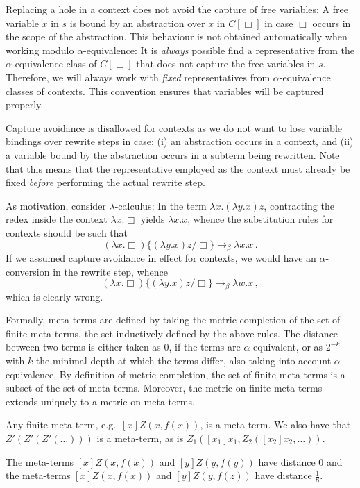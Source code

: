 \documentclass{LMCS}
\theoremstyle{plain}
\theoremstyle{definition}
\newcommand{\rew}{\rightarrow}
\begin{document}
Replacing a hole in a context does not avoid the capture of free variables: A free variable $x$ in $s$ is bound by an abstraction over $x$ in $C[\Box]$ in case $\Box$ occurs in the scope of the abstraction. This behaviour is not obtained automatically when working modulo $\alpha$-equivalence: It is \emph{always} possible find a representative from the $\alpha$-equivalence class of $C[\Box]$ that does not capture the free variables in $s$. Therefore, we will always work with \emph{fixed} representatives from $\alpha$-equivalence classes of contexts. This convention ensures that variables will be captured properly.

\begin{rem}
Capture avoidance is disallowed for contexts as we do not want to lose variable bindings over rewrite steps in case: (i) an abstraction occurs in a context, and (ii) a variable bound by the abstraction occurs in a subterm being rewritten. Note that this means that the representative employed as the context must already be fixed \emph{before} performing the actual rewrite step.

As motivation, consider $\lambda$-calculus: In the term
$\lambda x . (\lambda y . x) z$, contracting the redex 
inside the context $\lambda x . \Box$ yields
$\lambda x.x$, whence the substitution rules for contexts should
be such that 
\[
(\lambda x. \Box)\{(\lambda y . x) z / \Box\}
\rew_\beta \lambda x.x \, .
\]
 If we assumed capture avoidance
in effect for contexts, we would have an $\alpha$-conversion
in the rewrite step, whence
\[
(\lambda x .\Box)\{(\lambda y . x) z / \Box\}
\rew_\beta \lambda w . x \, ,
\]
which is clearly wrong.
\end{rem}

Formally, meta-terms are defined by taking the metric completion of the set of finite meta-terms, the set inductively defined by the above rules. The distance between two terms is either taken as $0$, if the terms are $\alpha$-equivalent, or as $2^{-k}$ with $k$ the minimal depth at which the terms differ, also taking into account $\alpha$-equivalence. By definition of metric completion, the set of finite meta-terms is a subset of the set of meta-terms. Moreover, the metric on finite meta-terms extends uniquely to a metric on meta-terms.

\begin{exa}
Any finite meta-term, e.g.\ $[x]Z(x,f(x))$, is a meta-term. We also have that $Z'(Z'(Z'(\ldots)))$ is a meta-term, as is $Z_1([x_1]x_1,Z_2([x_2]x_2,\ldots))$.

The meta-terms $[x]Z(x,f(x))$ and $[y]Z(y,f(y))$ have distance $0$ and the meta-terms $[x]Z(x,f(x))$ and $[y]Z(y,f(z))$ have distance $\frac{1}{8}$.
\end{exa}
\end{document}
